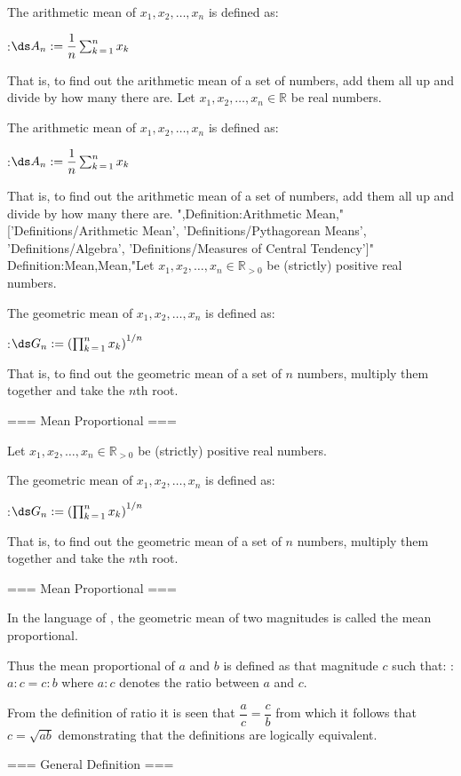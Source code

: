 The arithmetic mean of $x_1, x_2, \ldots, x_n$ is defined as:

:$\ds A_n := \dfrac 1 n \sum_{k \mathop = 1}^n x_k$

That is, to find out the arithmetic mean of a set of numbers, add them all up and divide by how many there are.
Let $x_1, x_2, \ldots, x_n \in \mathbb R$ be real numbers.

The arithmetic mean of $x_1, x_2, \ldots, x_n$ is defined as:

:$\ds A_n := \dfrac 1 n \sum_{k \mathop = 1}^n x_k$

That is, to find out the arithmetic mean of a set of numbers, add them all up and divide by how many there are.
",Definition:Arithmetic Mean,"['Definitions/Arithmetic Mean', 'Definitions/Pythagorean Means', 'Definitions/Algebra', 'Definitions/Measures of Central Tendency']"
Definition:Mean,Mean,"Let $x_1, x_2, \ldots, x_n \in \mathbb R_{>0}$ be (strictly) positive real numbers.

The geometric mean of $x_1, x_2, \ldots, x_n$ is defined as:

:$\ds G_n := \left( \prod_{k \mathop = 1}^n x_k \right)^{1/n}$


That is, to find out the geometric mean of a set of $n$ numbers, multiply them together and take the $n$th root.


=== Mean Proportional ===

Let $x_1, x_2, \ldots, x_n \in \mathbb R_{>0}$ be (strictly) positive real numbers.

The geometric mean of $x_1, x_2, \ldots, x_n$ is defined as:

:$\ds G_n := \left( \prod_{k \mathop = 1}^n x_k \right)^{1/n}$


That is, to find out the geometric mean of a set of $n$ numbers, multiply them together and take the $n$th root.


=== Mean Proportional ===

In the language of , the geometric mean of two magnitudes is called the mean proportional.

Thus the mean proportional of $a$ and $b$ is defined as that magnitude $c$ such that:
:$a : c = c : b$
where $a : c$ denotes the ratio between $a$ and $c$.


From the definition of ratio it is seen that $\dfrac a c = \dfrac c b$ from which it follows that $c = \sqrt {a b}$ demonstrating that the definitions are logically equivalent.


=== General Definition ===

